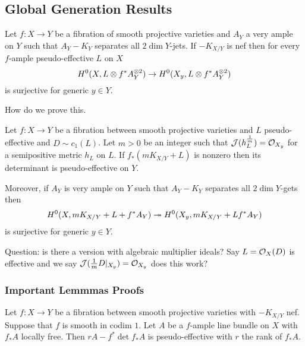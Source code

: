 \documentclass[12pt]{article}
\begin{document}
\subsection{Global Generation Results}

\begin{prop}
Let $f : X \to Y$ be a fibration of smooth projective varieties and $A_Y$ a very ample on $Y$ such that $A_Y - K_Y$ separates all $2\dim{Y}$-jets. If $-K_{X/Y}$ is nef then for every $f$-ample pseudo-effective $L$ on $X$
\[ H^0(X, L \otimes f^* A_Y^{\otimes 2}) \to H^0(X_y, L \otimes f^* A_Y^{\otimes 2}) \]
is surjective for generic $y \in Y$.
\end{prop}

How do we prove this. 

\begin{theorem}
Let $f : X \to Y$ be a fibration between smooth projective varieties and $L$ pseudo-effective and $D \sim c_1(L)$. Let $m > 0$ be an integer such that $\mathcal{J}(h_L^{\frac{1}{m}}) = \mathcal{O}_{X_y}$ for a semipositive metric $h_L$ on $L$. If $f_* (m K_{X/Y} + L)$ is nonzero then its determinant is pseudo-effective on $Y$.
\par 
Moreover, if $A_Y$ is very ample on $Y$ such that $A_Y - K_Y$ separates all $2 \dim{Y}$-gets then 
\[ H^0(X, mK_{X/Y} + L + f^* A_Y) \twoheadrightarrow H^0(X_y, m K_{X/Y} + L f^* A_Y) \]
is surjective for generic $y \in Y$.
\end{theorem}

Question: is there a version with algebraic multiplier ideals? Say $L = \mathcal{O}_{X}(D)$ is effective and we say $\mathcal{J}(\frac{1}{m}D|_{X_y}) = \mathcal{O}_{X_y}$ does this work?


\subsubsection{Important Lemmmas Proofs}

\begin{prop}
Let $f : X \to Y$ be a fibration between smooth projective varieties with $-K_{X/Y}$ nef. Suppose that $f$ is smooth in codim $1$. Let $A$ be a $f$-ample line bundle on $X$ with $f_* A$ locally free. Then $r A - f^* \det{f_* A}$ is pseudo-effective with $r$ the rank of $f_* A$.
\end{prop}
\end{document}
